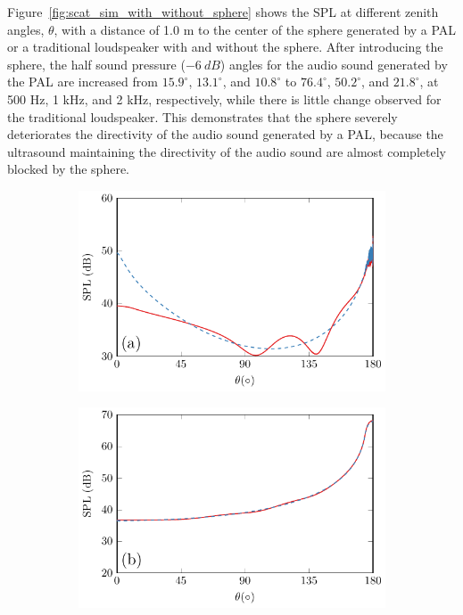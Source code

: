 Figure~\ref{fig:scat_sim_with_without_sphere} shows the SPL at different zenith angles, $\theta$, with a distance of 1.0 m to the center of the sphere generated by a PAL or a traditional loudspeaker with and without the sphere. 
After introducing the sphere, the half sound pressure ($\SI{-6}{ dB}$) angles for the audio sound generated by the PAL are increased from $15.9^\circ$, $13.1^\circ$, and $10.8^\circ$ to $76.4^\circ$, $50.2^\circ$, and $21.8^\circ$, at 500 Hz, 1 kHz, and 2 kHz, respectively, while there is little change observed for the traditional loudspeaker. 
This demonstrates that the sphere severely deteriorates the directivity of the audio sound generated by a PAL, because the ultrasound maintaining the directivity of the audio sound are almost completely blocked by the sphere. 

\begin{figure}[!htb]
    \centering
    \begin{subfigure}{0.49\textwidth}
        \centering
        \includegraphics[width = \textwidth]{fig/PalSphereNoSphere_VaryAngle_211211A_Compare_r100cm_500Hz_211211B.pdf}
    \end{subfigure}
    \begin{subfigure}{0.49\textwidth}
        \centering
        \includegraphics[width = \textwidth]{fig/CircPistonSphereNoSphere_210718D_500Hz_Compare_211013Ao_v2.pdf}

\end{subfigure}
\end{figure}
